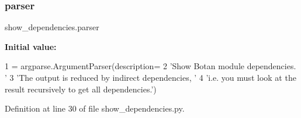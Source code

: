 \subsubsection{\texorpdfstring{parser}{parser}}
{\footnotesize\ttfamily show\+\_\+dependencies.\+parser}

{\bfseries Initial value\+:}
\begin{DoxyCode}
1 =  argparse.ArgumentParser(description=
2     \textcolor{stringliteral}{'Show Botan module dependencies. '}
3     \textcolor{stringliteral}{'The output is reduced by indirect dependencies, '}
4     \textcolor{stringliteral}{'i.e. you must look at the result recursively to get all dependencies.'})
\end{DoxyCode}


Definition at line 30 of file show\+\_\+dependencies.\+py.

